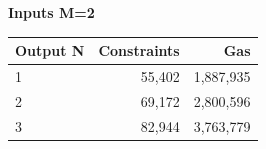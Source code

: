 \par\medskip\noindent
\begin{center}
{\small\setlength{\tabcolsep}{7pt}\renewcommand{\arraystretch}{1.12}
\textbf{Inputs M=2}\par\smallskip
\begin{tabular}{@{}lrr@{}}\toprule
\textbf{Output N} & \textbf{Constraints} & \textbf{Gas} \\
\midrule
1 & 55,402 & 1,887,935 \\
2 & 69,172 & 2,800,596 \\
3 & 82,944 & 3,763,779 \\
\bottomrule\end{tabular}}
\end{center}
\par\medskip
